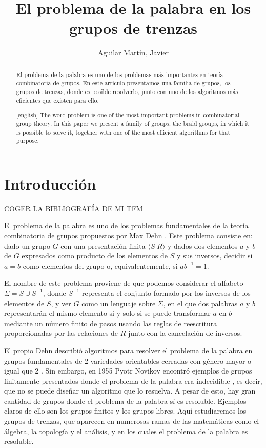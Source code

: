 \documentclass[bibtex, anon]{TEMat-article}
\title[]{El problema de la palabra en los grupos de trenzas}
\author*{Aguilar Martín, Javier}
\affiliation{Universidad de Sevilla (US)}
\begin{document}
\begin{abstract}
El problema de la palabra es uno de los problemas más importantes en teoría combinatoria de grupos. En este artículo presentamos una familia de grupos, los grupos de trenzas, donde es posible resolverlo, junto con uno de los algoritmos más eficientes que existen para ello. 
\end{abstract}
\begin{abstract}[english]
The word problem is one of the most important problems in combinatorial group theory. In this paper we present a family of groups, the braid groups, in which it is possible to solve it, together with one of the most efficient algorithms for that purpose.
\end{abstract}
\maketitle

\section{Introducción}
COGER LA BIBLIOGRAFÍA DE MI TFM

El problema de la palabra es uno de los problemas fundamentales de la teoría combinatoria de grupos propuestos por Max Dehn \cite{Dehn11}. Este problema consiste en: dado un grupo $G$ con una presentación finita $\langle S| R\rangle$ y dados dos elementos $a$ y $b$ de $G$ expresados como producto de los elementos de $S$ y sus inversos, decidir si $a=b$ como elementos del grupo o, equivalentemente, si $ab^{-1}=1$.

El nombre de este problema proviene de que podemos considerar el alfabeto $\Sigma=S\cup S^{-1}$, donde $S^{-1}$ representa el conjunto formado por los inversos de los elementos de $S$, y ver $G$ como un lenguaje sobre $\Sigma$, en el que dos palabras $a$ y $b$ representarán el mismo elemento si y solo si se puede transformar $a$ en $b$ mediante un número finito de pasos usando las reglas de reescritura proporcionadas por las relaciones de $R$ junto con la cancelación de inversos.  

El propio Dehn describió algoritmos para resolver el problema de la palabra en grupos fundamentales de 2-variedades orientables cerradas con género mayor o igual que 2 \cite{Dehn12}. Sin embargo, en 1955 Pyotr Novikov encontró ejemplos de grupos finitamente presentados donde el problema de la palabra era indecidible \cite{Novikov}, es decir, que no se puede diseñar un algoritmo que lo resuelva. A pesar de esto, hay gran cantidad de grupos donde el problema de la palabra sí es resoluble. Ejemplos claros de ello son los grupos finitos y los grupos libres. Aquí estudiaremos los grupos de trenzas, que aparecen en numerosas ramas de las matemáticas como el álgebra, la topología y el análisis, y en los cuales el problema de la palabra es resoluble.
\end{document}
